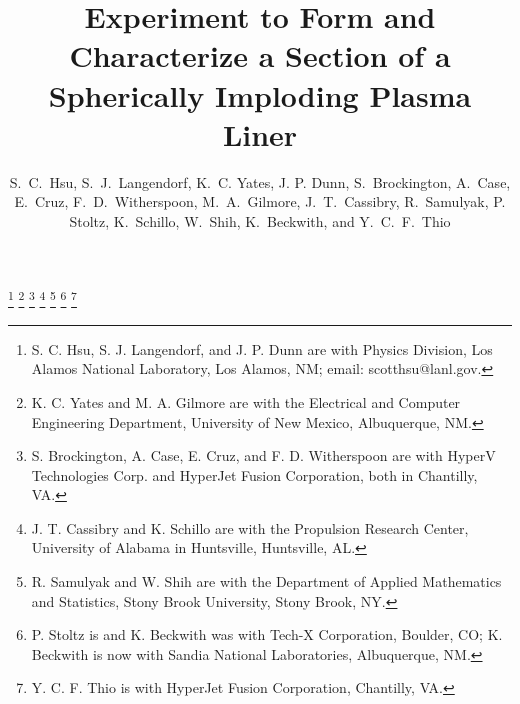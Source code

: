 \documentclass[journal]{IEEEtran}
\begin{document}
\title{Experiment to Form and Characterize a Section of a Spherically Imploding Plasma Liner}



\author{S.~C.~Hsu, 
	S.~J.~Langendorf, K.~C. Yates, J. P. Dunn,
	S.~Brockington, A.~Case, E.~Cruz, F.~D.~Witherspoon,
	M.~A.~Gilmore,
	J.~T.~Cassibry, R.~Samulyak, P. Stoltz, K.~Schillo, W.~Shih, K.~Beckwith, 
	and Y.~C.~F.~Thio}%
\thanks{S. C. Hsu, S. J. Langendorf, and J. P. Dunn are with Physics Division,
Los Alamos National Laboratory, Los Alamos, NM; email:  scotthsu@lanl.gov.}%
\thanks{K. C. Yates and M. A. Gilmore are with the Electrical and Computer Engineering
Department, University of New Mexico, Albuquerque, NM.}%
\thanks{S. Brockington, A. Case, E. Cruz, and F. D. Witherspoon are with HyperV Technologies Corp.
and HyperJet Fusion Corporation, both in Chantilly, VA.}
\thanks{J. T. Cassibry and K. Schillo are with the Propulsion Research Center,
University of Alabama in Huntsville, Huntsville, AL.}%
\thanks{R. Samulyak and W. Shih are with the Department of Applied Mathematics and Statistics, Stony Brook University, Stony Brook, NY.}%
\thanks{P. Stoltz is and K. Beckwith was with Tech-X Corporation, Boulder, CO; K. Beckwith is now
with Sandia National Laboratories, Albuquerque, NM.}
\thanks{Y. C. F. Thio is with HyperJet Fusion Corporation, Chantilly, VA.}%

% 
\end{document}
